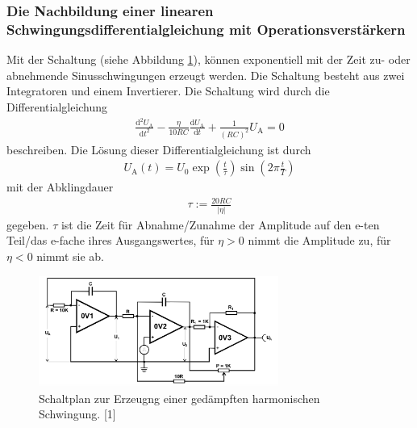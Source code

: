 \documentclass{scrartcl}
\begin{document}
\subsubsection{Die Nachbildung einer linearen Schwingungsdifferentialgleichung mit Operationsverstärkern}
Mit der Schaltung (siehe Abbildung \ref{harm}), können exponentiell mit der Zeit zu- oder abnehmende Sinusschwingungen erzeugt werden. Die Schaltung besteht aus zwei Integratoren und einem Invertierer. Die Schaltung wird durch die Differentialgleichung
\begin{align}
\frac{\mathrm{d}^2 U_\mathrm{A}}{\mathrm{d}t^2} - \frac{\eta}{10 RC}\frac{\mathrm{d}U_\mathrm{A}}{\mathrm{d}t} + \frac{1}{(RC)^2} U_\mathrm{A} = 0
\end{align}
beschreiben.  Die Lösung dieser Differentialgleichung ist durch
\begin{align}
U_\mathrm{A}(t) = U_0 \exp \left(\frac{t}{\tau} \right) \sin \left( 2 \pi \frac{t}{T} \right)
\end{align}
mit der Abklingdauer
\begin{align}
    \tau := \frac{20RC}{|\eta|}
    \label{schwingung:tau}
\end{align}
gegeben.
$\tau$ ist die Zeit für Abnahme/Zunahme der Amplitude auf den e-ten Teil/das e-fache ihres Ausgangswertes, für $\eta>0$ nimmt die Amplitude zu, für $\eta<0$ nimmt sie ab.
\begin{figure}[!h]
\centering
\includegraphics[width=0.7\textwidth]{gedschwingung}
\caption{Schaltplan zur Erzeugng einer gedämpften harmonischen Schwingung. [1]}
\label{harm}
\end{figure}
\end{document}
